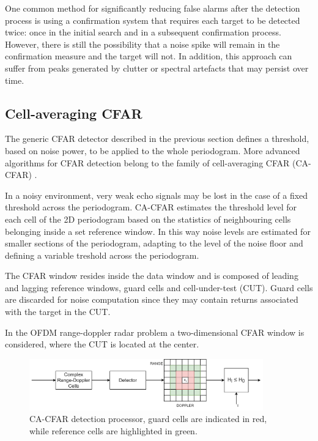One common method for significantly reducing false alarms after the detection process is using a confirmation system that requires each target to be detected twice: once in the initial search and in a subsequent confirmation process.
However, there is still the possibility that a noise spike will remain in the confirmation measure and the target will not. In addition, this approach can suffer from peaks generated by clutter or spectral artefacts that may persist over time.

\subsection{Cell-averaging CFAR}
\label{sec:cell averaging CFAR}

The generic CFAR detector described in the previous section defines a threshold, based on noise power, to be applied to the whole periodogram. More advanced algorithms for CFAR detection belong to the family of cell-averaging CFAR (CA-CFAR) \cite{Richards_2014}.

In a noisy environment, very weak echo signals may be lost in the case of a fixed threshold across the periodogram. CA-CFAR estimates the threshold level for each cell of the 2D periodogram based on the statistics of neighbouring cells belonging inside a set reference window. In this way noise levels are estimated for smaller sections of the periodogram, adapting to the level of the noise floor and defining a variable treshold across the periodogram.

The CFAR window resides inside the data window and is composed of leading and lagging reference windows, guard cells and cell-under-test (CUT). Guard cells are discarded for noise computation since they may contain returns associated with the target in the CUT.

In the OFDM range-doppler radar problem a two-dimensional CFAR window is considered, where the CUT is located at the center.

\begin{figure}[H]
	\centering
	\includegraphics[width=0.9\textwidth]{Images/radar_detect_threshold/cacfar_pipeline.png}
	\caption{CA-CFAR detection processor, guard cells are indicated in red, while reference cells are highlighted in green.}
	\label{fig:cacfar_pipeline}
\end{figure}


